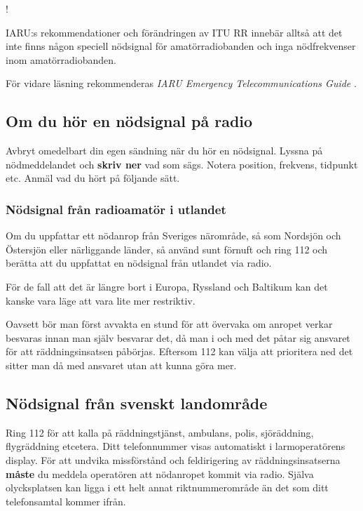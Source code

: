 \begin{center}
\begin{minipage}{0.19\columnwidth}
\Huge{\Huge{\hspace{1ex}!}}
\end{minipage}
\begin{minipage}{0.7\columnwidth}
IARU:s rekommendationer och förändringen av ITU RR innebär alltså att
det inte finns någon speciell nödsignal för amatörradiobanden och inga
nödfrekvenser inom amatörradiobanden.
\end{minipage}
\end{center}

För vidare läsning rekommenderas
\emph{IARU Emergency Telecommunications Guide} \cite{IARU-ETG}.

\subsection{Om du hör en nödsignal på radio}

Avbryt omedelbart din egen sändning när du hör en nödsignal. Lyssna på
nödmeddelandet och \textbf{skriv ner} vad som sägs.
Notera position, frekvens, tidpunkt etc. Anmäl vad du hört på följande sätt.

\subsubsection{Nödsignal från radioamatör i utlandet}

Om du uppfattar ett nödanrop från Sveriges närområde, så som Nordsjön och
Östersjön eller närliggande länder, så använd sunt förnuft och ring 112 och
berätta att du uppfattat en nödsignal från utlandet via radio.

För de fall att det är längre bort i Europa, Ryssland och Baltikum kan det
kanske vara läge att vara lite mer restriktiv.

Oavsett bör man först avvakta en stund för att övervaka om anropet verkar
besvaras innan man själv besvarar det, då man i och med det påtar sig ansvaret
för att räddningsinsatsen påbörjas.
Eftersom 112 kan välja att prioritera ned det sitter man då med ansvaret utan
att kunna göra mer.

\subsection{Nödsignal från svenskt landområde}

Ring 112 för att kalla på räddningstjänst, ambulans, polis, sjöräddning,
flygräddning etcetera.
Ditt telefonnummer visas automatiskt i larmoperatörens display.
För att undvika missförstånd och feldirigering av räddningsinsatserna
\textbf{måste} du meddela operatören att nödanropet kommit via radio.
Själva olycksplatsen kan ligga i ett helt annat riktnummerområde än det som ditt
telefonsamtal kommer ifrån.

